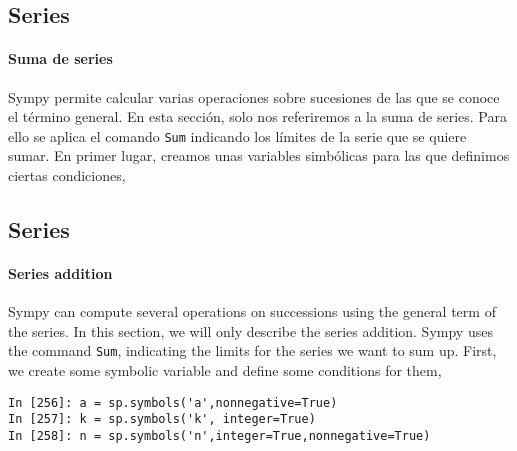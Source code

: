 \begin{paracol}{2}
\subsection{Series} 

\paragraph{Suma de series} Sympy permite calcular varias operaciones sobre sucesiones de las que se conoce el término general. En esta sección, solo nos referiremos a la suma de series. 
Para ello se aplica el comando \texttt{Sum} indicando los límites de la serie que se quiere sumar. En primer lugar, creamos unas variables simbólicas para las que definimos ciertas condiciones,
\switchcolumn
\subsection{Series}

\paragraph{Series addition} Sympy can compute several operations on successions using the general term of the series. In this section, we will only describe the series addition. Sympy uses the command \texttt{Sum}, indicating the limits for the series we want to sum up. First, we create some symbolic variable and define some conditions for them,


\end{paracol}
\begin{center}
	\begin{minipage}{.7\textwidth}
		\begin{verbatim}
In [256]: a = sp.symbols('a',nonnegative=True)
In [257]: k = sp.symbols('k', integer=True)
In [258]: n = sp.symbols('n',integer=True,nonnegative=True)
		\end{verbatim}
	\end{minipage}
\end{center}

